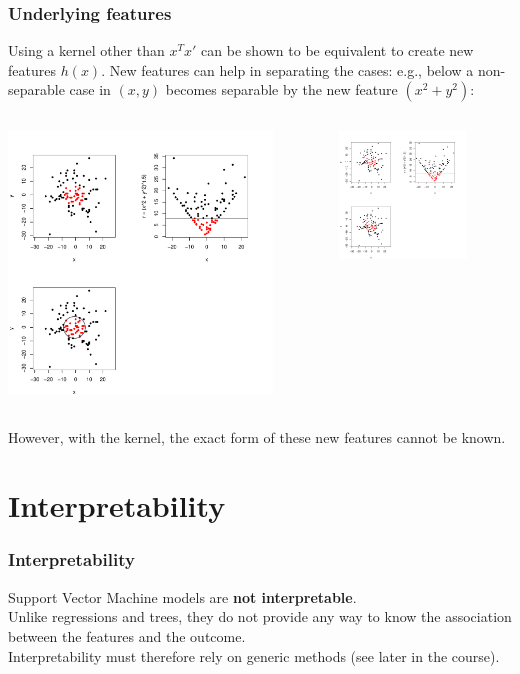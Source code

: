 \begin{frame}
\frametitle{Underlying features}
Using a kernel other than $x^Tx'$ can be shown to be equivalent to create new features $h(x)$. New features can help in separating the cases: e.g., below a non-separable case in $(x,y)$ becomes separable by the new feature $(x^2+y^2)$:\\
\vspace{0.3cm}

\begin{columns}
\begin{column}{0.66\linewidth}
\includegraphics[width=7cm]{../../Graphs/svm_quad.pdf} 
\end{column}
\begin{column}{0.34\linewidth}
\hspace{-1cm}
\includegraphics[width=3.4cm]{../../Graphs/svm_quad2.pdf} 
\vspace{0.2cm}
\end{column}
\end{columns}
However, with the kernel, the exact form of these new features cannot be known.
\end{frame}
\section{Interpretability}
\begin{frame}
\frametitle{Interpretability}
Support Vector Machine models are {\bf not interpretable}. \\
\vspace{0.3cm}
Unlike regressions and trees, they do not provide any way to know the association between the features and the outcome.\\
\vspace{0.3cm}
Interpretability must therefore rely on generic methods (see later in the course).
\end{frame}
